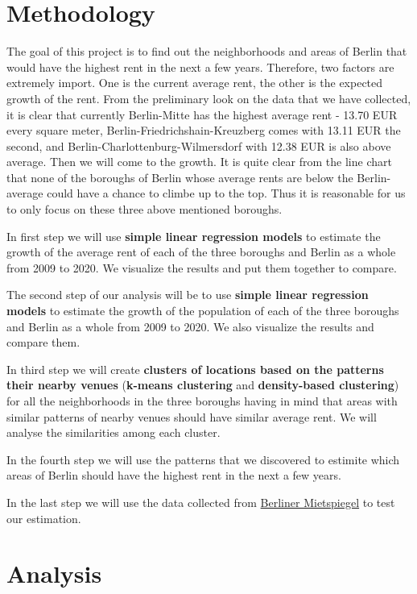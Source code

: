 \documentclass[11pt]{article}
\begin{document}
    \hypertarget{methodology}{%
\section{\texorpdfstring{Methodology
}{Methodology }}\label{methodology}}

    The goal of this project is to find out the neighborhoods and areas of
Berlin that would have the highest rent in the next a few years.
Therefore, two factors are extremely import. One is the current average
rent, the other is the expected growth of the rent. From the preliminary
look on the data that we have collected, it is clear that currently
Berlin-Mitte has the highest average rent - 13.70 EUR every square
meter, Berlin-Friedrichshain-Kreuzberg comes with 13.11 EUR the second,
and Berlin-Charlottenburg-Wilmersdorf with 12.38 EUR is also above
average. Then we will come to the growth. It is quite clear from the
line chart that none of the boroughs of Berlin whose average rents are
below the Berlin-average could have a chance to climbe up to the top.
Thus it is reasonable for us to only focus on these three above
mentioned boroughs.

In first step we will use \textbf{simple linear regression models} to
estimate the growth of the average rent of each of the three boroughs
and Berlin as a whole from 2009 to 2020. We visualize the results and
put them together to compare.

The second step of our analysis will be to use \textbf{simple linear
regression models} to estimate the growth of the population of each of
the three boroughs and Berlin as a whole from 2009 to 2020. We also
visualize the results and compare them.

In third step we will create \textbf{clusters of locations based on the
patterns their nearby venues} (\textbf{k-means clustering} and
\textbf{density-based clustering}) for all the neighborhoods in the
three boroughs having in mind that areas with similar patterns of nearby
venues should have similar average rent. We will analyse the
similarities among each cluster.

In the fourth step we will use the patterns that we discovered to
estimite which areas of Berlin should have the highest rent in the next
a few years.

In the last step we will use the data collected from
\href{https://www.stadtentwicklung.berlin.de/wohnen/mietspiegel/}{Berliner
Mietspiegel} to test our estimation.

    \hypertarget{analysis}{%
\section{\texorpdfstring{Analysis }{Analysis }}\label{analysis}}
\end{document}
